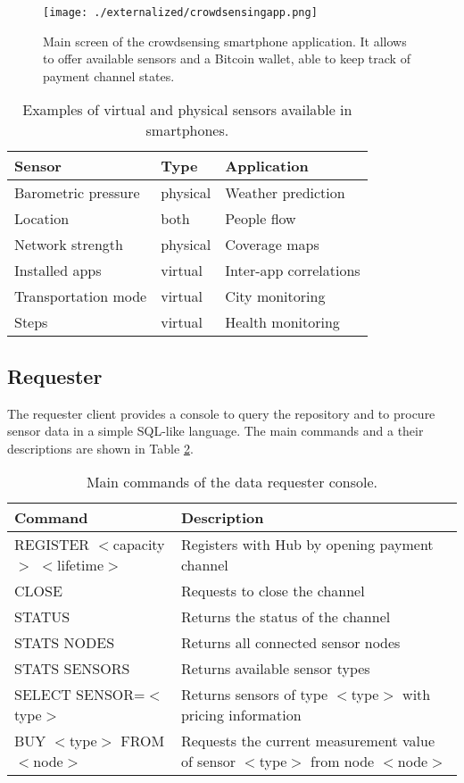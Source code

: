 \begin{figure}
 \centering
 \texttt{[image: ./externalized/crowdsensingapp.png]}
 \caption{Main screen of the crowdsensing smartphone application. It allows to offer available sensors and a Bitcoin wallet, able to keep track of payment channel states.}
 \label{fig:crowdsensingapp}
 \end{figure}

\begin{table}
  \centering
  \begin{tabularx}{\textwidth}{ l  l  X  }
    \toprule
    Sensor & Type & Application \\
    \midrule
    Barometric pressure & physical & Weather prediction \\ 
    Location & both & People flow  \\ 
    Network strength & physical & Coverage maps \\  
    Installed apps & virtual & Inter-app correlations    \\  
    Transportation mode & virtual & City monitoring \\ 
    Steps & virtual & Health monitoring  \\
    \bottomrule
  \end{tabularx}
  \caption{Examples of virtual and physical sensors available in smartphones.}
  \label{tbl:sensors}
\end{table}

\subsection{Requester}

The requester client provides a console to query the repository and to procure sensor data in a simple \ac{SQL}-like language. The main commands and a their descriptions are shown in Table \ref{tbl:commands}. 

\begin{table}\footnotesize
  \centering
    \begin{tabularx}{\textwidth}{ l X }
    \toprule
    Command & Description \\
    \midrule
    REGISTER $<$capacity$>$ $<$lifetime$>$ & Registers with Hub by opening payment channel \\
    CLOSE & Requests to close the channel \\
    STATUS & Returns the status of the channel \\
    STATS NODES & Returns all connected sensor nodes \\
    STATS SENSORS & Returns available sensor types \\
    SELECT SENSOR=$<$type$>$ & Returns sensors of type $<$type$>$ with pricing information \\
    BUY $<$type$>$ FROM $<$node$>$ & Requests the current measurement value of sensor $<$type$>$ from node $<$node$>$ \\
   \bottomrule
  \end{tabularx}
  \caption{Main commands of the data requester console.}
  \label{tbl:commands}
\end{table} 


